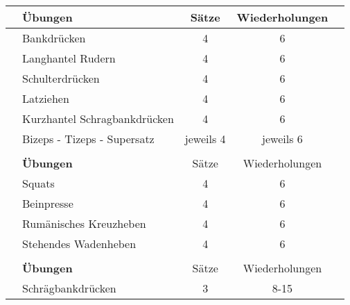 \documentclass{article}
\begin{document}
\begin{table}[ht]
\centering
\Large
\begin{tabular}{c|lccc}
\rowcolor[HTML]{FFCE93} & \textbf{Übungen} & Sätze     & Wiederholungen &  \\ \hline
\rowcolor[HTML]{EFEFEF} & Bankdrücken                  & 4         & 6              &                                  \\
\rowcolor[HTML]{FFFFFF} & Langhantel Rudern            & 4         & 6              &                                  \\
\rowcolor[HTML]{EFEFEF} & Schulterdrücken              & 4         & 6              &                                  \\
\rowcolor[HTML]{FFFFFF} & Latziehen                    & 4         & 6              &                                  \\
\rowcolor[HTML]{EFEFEF} & Kurzhantel Schragbankdrücken & 4         & 6              &                                  \\
\rowcolor[HTML]{FFFFFF} & Bizeps - Tizeps - Supersatz  & jeweils 4 & jeweils 6      &                                  \\ \hline
                        &                              &           &                &                                  \\
\rowcolor[HTML]{FFCE93} & \textbf{Übungen} & Sätze     & Wiederholungen &  \\ \hline
\rowcolor[HTML]{EFEFEF} & Squats                       & 4         & 6              &                                  \\
\rowcolor[HTML]{FFFFFF} & Beinpresse                   & 4         & 6              &                                  \\
\rowcolor[HTML]{EFEFEF} & Rumänisches Kreuzheben       & 4         & 6              &                                  \\
\rowcolor[HTML]{FFFFFF} & Stehendes Wadenheben         & 4         & 6              &                                  \\ \hline
                        &                              &           &                &                                  \\
\rowcolor[HTML]{FFCE93} & \textbf{Übungen} & Sätze     & Wiederholungen &  \\ \hline
\rowcolor[HTML]{EFEFEF} & Schrägbankdrücken            & 3         & 8-15              &                                  \\

\end{tabular}
\end{table}
\end{document}
